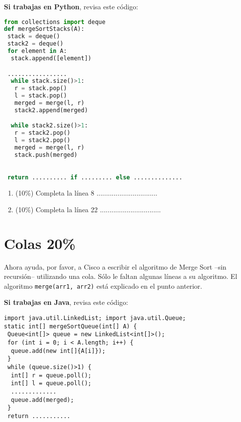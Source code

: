 \documentclass[10 pt]{article}
\begin{document}
\begin{multicols}{2}
\textbf{Si trabajas en Python}, revisa este código:

{\footnotesize
\begin{lstlisting}[language=Python]
from collections import deque
def mergeSortStacks(A):
 stack = deque()
 stack2 = deque()
 for element in A:
  stack.append([element])

 .................
  while stack.size()>1:
   r = stack.pop()
   l = stack.pop()
   merged = merge(l, r)
   stack2.append(merged)

  while stack2.size()>1:
   r = stack2.pop()
   l = stack2.pop()
   merged = merge(l, r)
   stack.push(merged)
  

 return .......... if ......... else .............. 

\end{lstlisting}
}


\begin{enumerate}[label=\Alph*]
	\item (10\%) Completa la línea 8 ................................\\

	\item (10\%) Completa la línea 22 ................................\\

\end{enumerate}
\section{Colas 20\%}
Ahora ayuda, por favor, a Cisco a escribir el algoritmo de Merge Sort --sin recursión-- utilizando una cola. Sólo le faltan algunas líneas a su algoritmo. 
El algoritmo \texttt{merge(arr1, arr2)} está explicado en el punto anterior. 

\textbf{Si trabajas en Java}, revisa este código:

{\footnotesize
\begin{lstlisting}
import java.util.LinkedList; import java.util.Queue;
static int[] mergeSortQueue(int[] A) {
 Queue<int[]> queue = new LinkedList<int[]>();
 for (int i = 0; i < A.length; i++) {
  queue.add(new int[]{A[i]});
 }
 while (queue.size()>1) {
  int[] r = queue.poll();
  int[] l = queue.poll();
  .............
  queue.add(merged);  
 }
 return ...........
\end{lstlisting}
}



\end{multicols}
\end{document}
